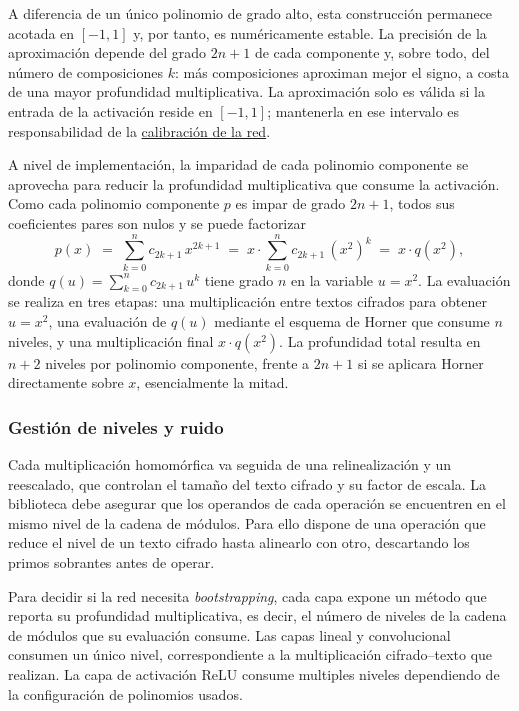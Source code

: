 A diferencia de un único polinomio de grado alto, esta construcción permanece acotada en $[-1,1]$ y, por tanto, es numéricamente estable. La precisión de la aproximación depende del grado $2n+1$ de cada componente y, sobre todo, del número de composiciones $k$: más composiciones aproximan mejor el signo, a costa de una mayor profundidad multiplicativa. La aproximación solo es válida si la entrada de la activación reside en $[-1, 1]$; mantenerla en ese intervalo es responsabilidad de la \hyperref[sec:metodo_calibracion]{calibración de la red}.

A nivel de implementación, la imparidad de cada polinomio componente se aprovecha para reducir la profundidad multiplicativa que consume la activación. Como cada polinomio componente $p$ es impar de grado $2n+1$, todos sus coeficientes pares son nulos y se puede factorizar
\[
    p(x) \;=\; \sum_{k=0}^{n} c_{2k+1}\, x^{2k+1} \;=\; x \cdot \sum_{k=0}^{n} c_{2k+1}\, (x^2)^{k} \;=\; x \cdot q(x^2),
\]
donde $q(u) = \sum_{k=0}^{n} c_{2k+1}\, u^{k}$ tiene grado $n$ en la variable $u = x^2$. La evaluación se realiza en tres etapas: una multiplicación entre textos cifrados para obtener $u = x^2$, una evaluación de $q(u)$ mediante el esquema de Horner que consume $n$ niveles, y una multiplicación final $x \cdot q(x^2)$. La profundidad total resulta en $n+2$ niveles por polinomio componente, frente a $2n+1$ si se aplicara Horner directamente sobre $x$, esencialmente la mitad.

\subsubsection{Gestión de niveles y ruido}

Cada multiplicación homomórfica va seguida de una relinealización y un reescalado, que controlan el tamaño del texto cifrado y su factor de escala. La biblioteca debe asegurar que los operandos de cada operación se encuentren en el mismo nivel de la cadena de módulos. Para ello dispone de una operación que reduce el nivel de un texto cifrado hasta alinearlo con otro, descartando los primos sobrantes antes de operar.

Para decidir si la red necesita \textit{bootstrapping}, cada capa expone un método que reporta su profundidad multiplicativa, es decir, el número de niveles de la cadena de módulos que su evaluación consume. Las capas lineal y convolucional consumen un único nivel, correspondiente a la multiplicación cifrado--texto que realizan. La capa de activación ReLU consume multiples niveles dependiendo de la configuración de polinomios usados.

